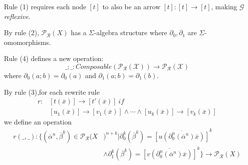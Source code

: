 \documentclass{beamer}
\begin{document}
\begin{frame}
    \scriptsize
    Rule (1) requires each node $[t]$ to also be an arrow $[t] : [t] \rightarrow [t]$, making $\mathcal{G}$ \emph{reflexive}.

    \bigskip
    \pause

    By rule (2), $\mathcal{P_R}(X)$ has a $\Sigma$-algebra structure where $\partial_0,\partial_1$ are 
    $\Sigma$-omomorphisms.

    \bigskip
    \pause
    Rule (4) defines a new operation:
    $$
    \_;\_ : Composable(\mathcal{P_R(X)}) \rightarrow \mathcal{P_R(X)}
    $$
    where $\partial_0(a;b) = \partial_0(a)$ and $\partial_1(a;b) = \partial_1(b)$.

    \bigskip
    \pause
    By rule (3),for each rewrite rule 
    \begin{align*}
        r:&[t(\overline{x})] \rightarrow [t'(\overline{x})]\ if \\ 
        &[u_1(\overline{x})] \rightarrow [v_1(\overline{x})] \wedge \cdots \wedge [u_k(\overline{x})] \rightarrow [v_k(\overline{x})] 
    \end{align*}
    we define an operation 
    \begin{align*}
        r(\_,\_) : \{(\overline{\alpha}^n,\overline{\beta}^k) \in \mathcal{P_R}(X&)^{n+k} 
        | \partial_0^k(\overline{\beta}^k) = \overline{[u(\partial_0^n(\overline{\alpha}^n)\overline{x})]}^k \\
        &\wedge  \partial_1^k(\overline{\beta}^k) = \overline{[v(\partial_0^n(\overline{\alpha}^n)\overline{x})]}^k\} \rightarrow \mathcal{P_R}(X)
    \end{align*}
\end{frame}
\end{document}
